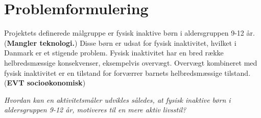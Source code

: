 \section{Problemformulering}
Projektets definerede målgruppe er fysisk inaktive børn i aldersgruppen 9-12 år. (\textbf{Mangler teknologi.}) Disse børn er udsat for fysisk inaktivitet, hvilket i Danmark er et stigende problem. Fysisk inaktivitet har en bred række helbredsmæssige konsekvenser, eksempelvis overvægt. Overvægt kombineret med fysisk inaktivitet er en tilstand for forværrer barnets helbredsmæssige tilstand. (\textbf{EVT socioøkonomisk})


%
%	


\begin{center}
\textit{Hvordan kan en aktivitetsmåler udvikles således, at fysisk inaktive børn i aldersgruppen 9-12 år, motiveres til en mere aktiv livsstil?}
\end{center}